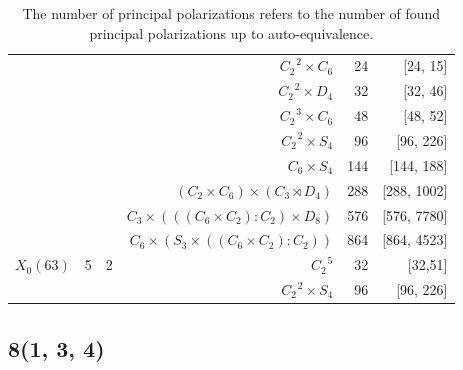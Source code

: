 \documentclass[12pt,reqno]{amsart}
\theoremstyle{definition}
\theoremstyle{remark}
\begin{document}
\begin{table}[H]
\begin{tabular}{ l | c c r r r}
& & & $C_2^{\text{ } 2} \times C_6$  & 24  & [24, 15] \\
 
& & & $C_2^{\text{ } 2} \times D_4$  & 32 & [32, 46] \\
 
& & 	& $C_2^{\text{ }3} \times C_6$ & 48 &  [48, 52] \\
 

& & & $C_2^{\text{ }2}\times S_4$ & 96 & [96, 226] \\

& & & $C_6 \times S_4$ & 144 & [144, 188] \\

& & & $(C_2 \times C_6) \times (C_3 \rtimes D_4)$  & 288 & [288, 1002]  \\

& & & $C_3 \times (((C_6 \times C_2) : C_2) \times D_8)$ & 576 & [576, 7780] \\ 

& & & $C_6 \times (S_3 \times ((C_6 \times C_2) : C_2))$ & 864 & [864, 4523] \\ \hline

$X_0(63)$ & 5 & 2 & $C_2^{\text{ }5}$ & 32 & [32,51] \\
& & & $C_2 ^{\text{ }2} \times S_4$ &  96 & [96, 226] \\ \hline
\end{tabular}
\label{table:pp} 
\caption*{The number of principal polarizations refers to the number of found principal polarizations up to auto-equivalence.}
\end{table}




\subsection{8(1, 3, 4)}
\end{document}
